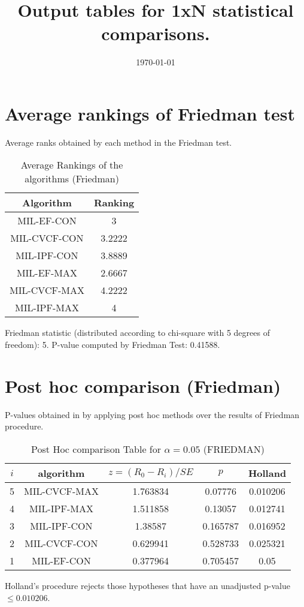 \documentclass[a4paper,10pt]{article}
\title{Output tables for 1xN statistical comparisons.}
\author{}
\date{\today}
\begin{document}
\begin{landscape}
\pagestyle{empty}
\maketitle
\thispagestyle{empty}

\section{Average rankings of Friedman test}


Average ranks obtained by each method in the Friedman test.

\begin{table}[!htp]
\centering
\begin{tabular}{|c|c|}\hline
Algorithm&Ranking\\\hline
MIL-EF-CON&3\\MIL-CVCF-CON&3.2222\\MIL-IPF-CON&3.8889\\MIL-EF-MAX&2.6667\\MIL-CVCF-MAX&4.2222\\MIL-IPF-MAX&4\\\hline\end{tabular}
\caption{Average Rankings of the algorithms (Friedman)}
\end{table}

Friedman statistic (distributed according to chi-square with 5 degrees of freedom): 5. \newline P-value computed by Friedman Test: 0.41588.\newline


\newpage

\section{Post hoc comparison (Friedman)}


P-values obtained in by applying post hoc methods over the results of Friedman procedure.

\begin{table}[!htp]
\centering\footnotesize
\begin{tabular}{ccccc}
$i$&algorithm&$z=(R_0 - R_i)/SE$&$p$&Holland\\
\hline5&MIL-CVCF-MAX&1.763834&0.07776&0.010206\\4&MIL-IPF-MAX&1.511858&0.13057&0.012741\\3&MIL-IPF-CON&1.38587&0.165787&0.016952\\2&MIL-CVCF-CON&0.629941&0.528733&0.025321\\1&MIL-EF-CON&0.377964&0.705457&0.05\\\hline
\end{tabular}
\caption{Post Hoc comparison Table for $\alpha=0.05$ (FRIEDMAN)}
\end{table}Holland's procedure rejects those hypotheses that have an unadjusted p-value $\le0.010206$.



\end{landscape}
\end{document}
